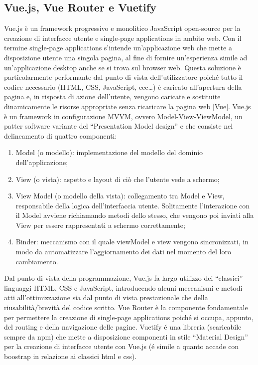 \documentclass{report}
\begin{document}
\subsection{Vue.js, Vue Router e Vuetify}
Vue.js è un framework progressivo e monolitico JavaScript open-source per la creazione di interfacce utente e single-page applications in ambito web.
\newline
Con il termine single-page applications s’intende un’applicazione web che mette a disposizione utente una singola pagina, al fine di fornire un’esperienza simile ad un’applicazione desktop anche se si trova sul browser web. Questa soluzione è particolarmente performante dal punto di vista dell’utilizzatore poiché tutto il codice necessario (HTML, CSS, JavaScript, ecc…) è caricato all’apertura della pagina e, in risposta di azione dell’utente, vengono caricate e sostituite dinamicamente le risorse appropriate senza ricaricare la pagina web [Vue].
\newline
Vue.js è un framework in configurazione MVVM, ovvero Model-View-ViewModel, un patter software variante del “Presentation Model design” e che consiste nel delineamento di quattro componenti:
\begin{enumerate}
    \item Model (o modello): implementazione del modello del dominio dell’applicazione;
    \item View (o vista): aspetto e layout di ciò che l’utente vede a schermo;
    \item View Model (o modello della vista): collegamento tra Model e View, responsabile della logica dell’interfaccia utente. Solitamente l’interazione con il Model avviene richiamando metodi dello stesso, che vengono poi inviati alla View per essere rappresentati a schermo correttamente;
    \item Binder: meccanismo con il quale viewModel e view vengono sincronizzati, in modo da automatizzare l’aggiornamento dei dati nel momento del loro cambiamento.
\end{enumerate}
Dal punto di vista della programmazione, Vue.js fa largo utilizzo dei “classici” linguaggi HTML, CSS e JavaScript, introducendo alcuni meccanismi e metodi atti all’ottimizzazione sia dal punto di vista prestazionale che della riusabilità/brevità del codice scritto.
\newline \newline
Vue Router è la componente fondamentale per permettere la creazione di single-page applications poiché si occupa, appunto, del routing e della navigazione delle pagine.
\newline \newline
Vuetify é una libreria (scaricabile sempre da npm) che mette a disposizione componenti in stile “Material Design” per la creazione di interfacce utente con Vue.js (é simile a quanto accade con boostrap in relazione ai classici html e css).
\end{document}
